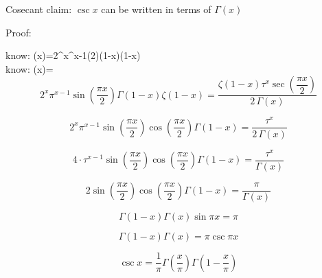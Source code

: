 \documentclass[12pt]{article}
\begin{document}
\pagebreak
\begin{section}{Cosecant}
	claim: $\csc x$ can be written in terms of $\Gamma(x)$

	\noindent Proof:

	\noindent know: \zeta(x)=2^x\pi^{x-1}\sin\left(2\right)\Gamma(1-x)\zeta(1-x)\\
	
	\noindent know: \zeta(x)=\\

	\begin{equation}
		2^x\pi^{x-1}\sin\left(\dfrac{\pi x}2\right)\Gamma(1-x)\zeta(1-x)=\dfrac{\zeta(1-x)\tau^x\sec\left(\dfrac{\pi x}2\right)}{2\,\Gamma(x)}
	\end{equation}

	\begin{equation}
		2^x\pi^{x-1}\sin\left(\dfrac{\pi x}2\right)\cos\left(\dfrac{\pi x}2\right)\Gamma(1-x)=\dfrac{\tau^x}{2\,\Gamma(x)}
	\end{equation}

	\begin{equation}
		4\cdot\tau^{x-1}\sin\left(\dfrac{\pi x}2\right)\cos\left(\dfrac{\pi x}2\right)\Gamma(1-x)=\dfrac{\tau^x}{\Gamma(x)}
	\end{equation}

	\begin{equation}
		2\sin\left(\dfrac{\pi x}2\right)\cos\left(\dfrac{\pi x}2\right)\Gamma(1-x)=\dfrac{\pi}{\Gamma(x)}
	\end{equation}

	\begin{equation}
		\Gamma(1-x)\Gamma(x)\sin\pi x=\pi
	\end{equation}

	\begin{equation}
		\Gamma(1-x)\Gamma(x)=\pi\csc\pi x
	\end{equation}

	\begin{equation}
		\csc x=\dfrac1\pi\Gamma\left(\dfrac x\pi\right)\Gamma\left(1-\dfrac x\pi\right)
	\end{equation}

	\noindent\blacksquare
\end{section}
\pagebreak
\end{document}
